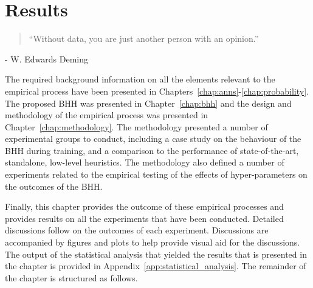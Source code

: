 \chapter{Results}
\label{chap:results}

\begin{quotation}
	\noindent ``Without data, you are just another person with an opinion.''
\end{quotation}
\begin{flushright}
	- W. Edwards Deming
\end{flushright}

The required background information on all the elements relevant to the empirical process have been presented in Chapters~\ref{chap:anns}-\ref{chap:probability}. The proposed \acf{BHH} was presented in Chapter~\ref{chap:bhh} and the design and methodology of the empirical process was presented in Chapter~\ref{chap:methodology}. The methodology presented a number of experimental groups to conduct, including a case study on the behaviour of the \acs{BHH} during training, and a comparison to the performance of state-of-the-art, standalone, low-level heuristics. The methodology also defined a number of experiments related to the empirical testing of the effects of hyper-parameters on the outcomes of the \acs{BHH}.

Finally, this chapter provides the outcome of these empirical processes and provides results on all the experiments that have been conducted. Detailed discussions follow on the outcomes of each experiment. Discussions are accompanied by figures and plots to help provide visual aid for the discussions. The output of the statistical analysis that yielded the results that is presented in the chapter is provided in Appendix~\ref{app:statistical_analysis}. The remainder of the chapter is structured as follows.

